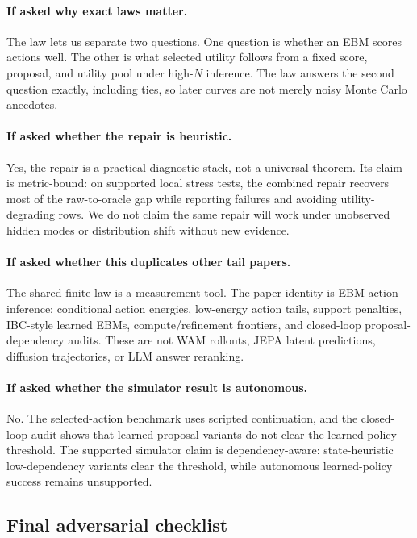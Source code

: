 \paragraph{If asked why exact laws matter.}
The law lets us separate two questions. One question is whether an EBM scores
actions well. The other is what selected utility follows from a fixed score,
proposal, and utility pool under high-\(N\) inference. The law answers the
second question exactly, including ties, so later curves are not merely noisy
Monte Carlo anecdotes.

\paragraph{If asked whether the repair is heuristic.}
Yes, the repair is a practical diagnostic stack, not a universal theorem. Its
claim is metric-bound: on supported local stress tests, the combined repair
recovers most of the raw-to-oracle gap while reporting failures and avoiding
utility-degrading rows. We do not claim the same repair will work under
unobserved hidden modes or distribution shift without new evidence.

\paragraph{If asked whether this duplicates other tail papers.}
The shared finite law is a measurement tool. The paper identity is EBM action
inference: conditional action energies, low-energy action tails, support
penalties, IBC-style learned EBMs, compute/refinement frontiers, and
closed-loop proposal-dependency audits. These are not WAM rollouts, JEPA
latent predictions, diffusion trajectories, or LLM answer reranking.

\paragraph{If asked whether the simulator result is autonomous.}
No. The selected-action benchmark uses scripted continuation, and the
closed-loop audit shows that learned-proposal variants do not clear the
learned-policy threshold. The supported simulator claim is dependency-aware:
state-heuristic low-dependency variants clear the threshold, while autonomous
learned-policy success remains unsupported.

\subsection{Final adversarial checklist}
\label{app:V4-adversarial-checklist}

